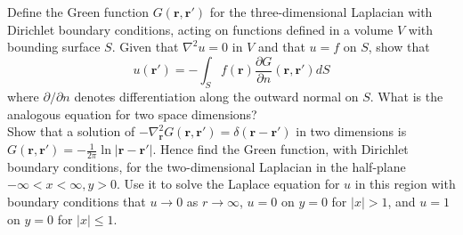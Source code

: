\documentclass[a4paper]{article}
\begin{document}
\newpage
\begin{qns}
Define the Green function $G(\mathbf{r},\mathbf{r'})$ for the three-dimensional Laplacian with Dirichlet boundary conditions, acting on functions defined in a volume $V$ with bounding surface $S$. Given that $\nabla^2u=0$ in $V$ and that $u = f$ on $S$, show that
$$u(\mathbf{r'})=-\int_Sf(\mathbf{r})\frac{\partial G}{\partial n}(\mathbf{r},\mathbf{r'})dS$$
where $\partial/\partial n$ denotes differentiation along the outward normal on $S$. What is the analogous equation for two space dimensions?\\[5pt]
Show that a solution of $-\nabla^2_\mathbf{r}G(\mathbf{r},\mathbf{r'})=\delta(\mathbf{r}-\mathbf{r'})$ in two dimensions is $G(\mathbf{r},\mathbf{r'})=-\frac{1}{2\pi}\ln|\mathbf{r}-\mathbf{r'}|$.  Hence find the Green function, with Dirichlet boundary conditions, for the two-dimensional Laplacian in the half-plane $-\infty<x<\infty, y>0$. Use it to solve the Laplace equation for $u$ in this region with boundary conditions that $u\rightarrow0$ as $r\rightarrow\infty$, $u = 0$ on $y = 0$ for $|x|>1$, and $u = 1$ on $y = 0$ for $|x|\leq 1$.
\end{qns}
\end{document}
